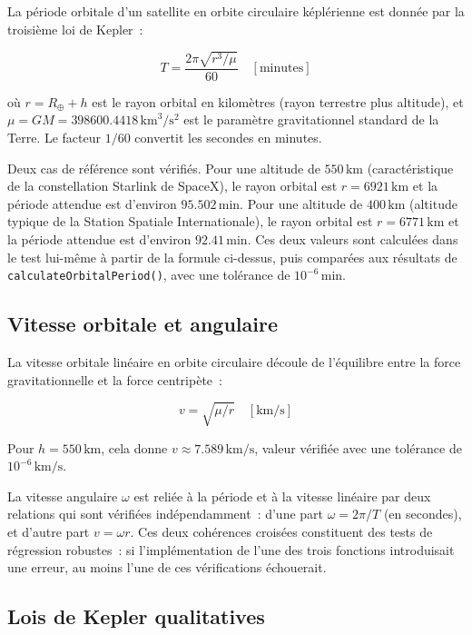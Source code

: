 \documentclass[12pt,a4paper]{article}
\begin{document}
La période orbitale d'un satellite en orbite circulaire képlérienne est donnée par la troisième loi de Kepler~:

\begin{equation}
    T = \frac{2\pi\sqrt{r^3/\mu}}{60} \quad [\text{minutes}]
\end{equation}

où $r = R_\oplus + h$ est le rayon orbital en kilomètres (rayon terrestre plus altitude), et $\mu = GM = 398600.4418\,\text{km}^3/\text{s}^2$ est le paramètre gravitationnel standard de la Terre. Le facteur $1/60$ convertit les secondes en minutes.

Deux cas de référence sont vérifiés. Pour une altitude de $550\,\text{km}$ (caractéristique de la constellation Starlink de SpaceX), le rayon orbital est $r = 6921\,\text{km}$ et la période attendue est d'environ $95.502\,\text{min}$. Pour une altitude de $400\,\text{km}$ (altitude typique de la Station Spatiale Internationale), le rayon orbital est $r = 6771\,\text{km}$ et la période attendue est d'environ $92.41\,\text{min}$. Ces deux valeurs sont calculées dans le test lui-même à partir de la formule ci-dessus, puis comparées aux résultats de \texttt{calculateOrbitalPeriod()}, avec une tolérance de $10^{-6}\,\text{min}$.

\subsection{Vitesse orbitale et angulaire}

La vitesse orbitale linéaire en orbite circulaire découle de l'équilibre entre la force gravitationnelle et la force centripète~:

\begin{equation}
    v = \sqrt{\mu / r} \quad [\text{km/s}]
\end{equation}

Pour $h = 550\,\text{km}$, cela donne $v \approx 7.589\,\text{km/s}$, valeur vérifiée avec une tolérance de $10^{-6}\,\text{km/s}$.

La vitesse angulaire $\omega$ est reliée à la période et à la vitesse linéaire par deux relations qui sont vérifiées indépendamment~: d'une part $\omega = 2\pi/T$ (en secondes), et d'autre part $v = \omega r$. Ces deux cohérences croisées constituent des tests de régression robustes~: si l'implémentation de l'une des trois fonctions introduisait une erreur, au moins l'une de ces vérifications échouerait.

\subsection{Lois de Kepler qualitatives}
\end{document}

